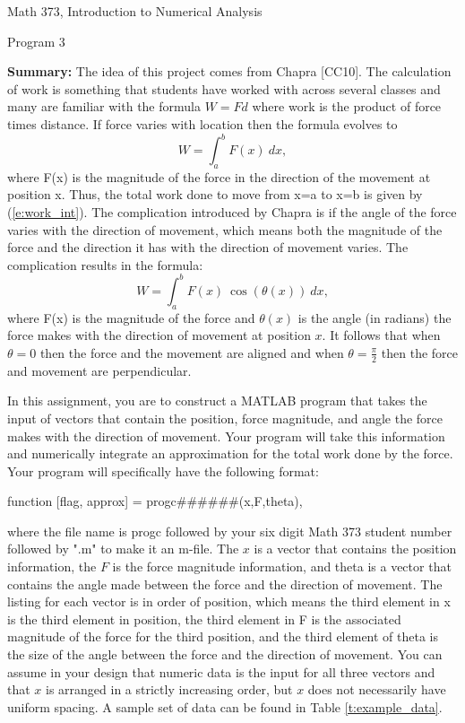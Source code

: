 \documentclass{article}
\renewcommand{\cite}[1]{[#1]}
\def\ds{\displaystyle}
\begin{document}

\large

{\Large Math 373, Introduction to Numerical Analysis}


{\Large Program 3} \par \medskip \noindent
%
{\bf Summary:} The idea of this project comes from Chapra \cite{CC10}. The calculation of work is something that students have worked with across several classes and many are familiar with the formula $W = Fd$ where work is the product of force times distance. If force varies with location then the formula evolves to 
\begin{equation}
 W = \int_a ^b F(x) \ dx,
 \label{e:work_int}
\end{equation}
where F(x) is the magnitude of the force in the direction of the movement at position x. Thus, the total work done to move from x=a to x=b is given by (\ref{e:work_int}). The complication introduced by Chapra is if the angle of the force varies with the direction of movement, which means both the magnitude of the force and the direction it has with the direction of movement varies. The complication results in the formula:
\begin{equation}
W = \int_a^b F(x) \ \cos (\theta(x)) \ dx, 
\label{e:work_int2}
\end{equation}
where F(x) is the magnitude of the force and $\theta (x)$ is the angle (in radians) the force makes with the direction of movement at position $x$. It follows that when $\theta = 0$ then the force and the movement are aligned and when $\ds \theta = \frac {\pi}2$ then the force and movement are perpendicular. 
\par \bigskip \par \noindent
In this assignment, you are to construct a MATLAB program that takes the input of vectors that contain the position, force magnitude, and angle the force makes with the direction of movement. Your program will take this information and numerically integrate an approximation for the total work done by the force. Your program will specifically have the following format: \par \medskip
function [flag, approx] = progc\#\#\#\#\#\#(x,F,theta), \par \medskip \noindent
%
where the file name is progc followed by your six digit Math 373 student number  followed by ".m" to make it an m-file. The $x$ is a vector that contains the position information, the $F$ is the force magnitude information, and theta is a vector that contains the angle made between the force and the direction of movement. The listing for each vector is in order of position, which means the third element in x is the third element in position, the third element in F is the associated magnitude of the force for the third position, and the third element of theta is the size of the angle between the force and the direction of movement. You can assume in your design that numeric data is the input for all three vectors and that $x$ is arranged in a strictly increasing order, but $x$ does not necessarily have uniform spacing. A sample set of data can be found in Table \ref{t:example_data}. 
\end{document}
